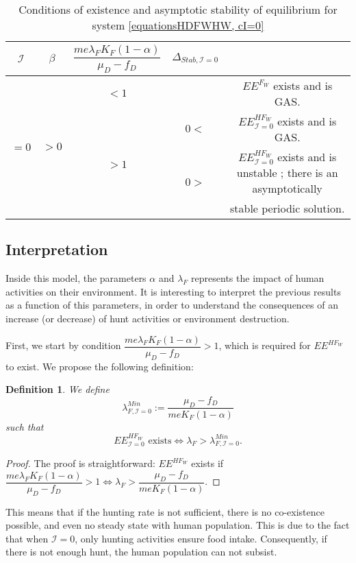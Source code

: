 \documentclass{article}
\newcommand{\lfw}{\lambda_{F}}
\newcommand{\lfw}{\lambda_{F}}
\newcommand{\cI}{\mathcal{I}}
\newtheorem{definition}{Definition}
\begin{document}
\begin{table}[!ht]
\centering
\def\arraystretch{2}
\begin{tabular}{c|c|c|c|c}
$\cI$ &$\beta$ & $\dfrac{m e\lfw K_F(1-\alpha)}{\mu_D - f_D}$ &  $\Delta_{Stab, \cI =0}$ & \\
\hline
\multirow{4}{*}{$=0$}&\multirow{4}{*}{$>0$} & $ < 1$ & &$EE^{F_W}$ exists and is GAS.  \\
\cline{3-5}
 & & \multirow{3}{*}{$> 1$} & $ 0<$ &$EE^{HF_W}_{\cI=0}$ exists and is GAS.\\
 \cline{4-5}
 & & &\multirow{2}{*}{$ 0> $} & $EE^{HF_W}_{\cI=0}$ exists and is unstable ; there is an asymptotically \\
& & & &  stable periodic solution.
\end{tabular}
\caption{\centering Conditions of existence and asymptotic stability of equilibrium for system \eqref{equationsHDFWHW, cI=0}}
\end{table}

\subsection{Interpretation}
Inside this model, the parameters $\alpha$ and $\lfw$ represents the impact of human activities on their environment. It is interesting to interpret the previous results as a function of this parameters, in order to understand the consequences of an increase (or decrease) of hunt activities or environment destruction.

First, we start by condition $\dfrac{m e \lfw  K_F(1-\alpha)}{\mu_D - f_D} > 1$, which is required for $EE^{HF_W}$ to exist. We propose the following definition:

\begin{definition}\label{defLambdaMin, cI=0} We define 
$$\lambda_{F, \cI=0}^{Min} := \dfrac{\mu_D - f_D}{m e K_F(1-\alpha)}$$
such that 
$$
\text{$EE^{HF_W}_{\cI = 0}$ exists} \Leftrightarrow  \lfw > \lambda_{F, \cI=0}^{Min}.
$$
\end{definition}
\begin{proof}
The proof is straightforward: $EE^{HF_W}$ exists if $\dfrac{m e \lfw K_F(1-\alpha)}{\mu_D - f_D} > 1 \Leftrightarrow  \lfw> \dfrac{\mu_D - f_D}{ m e K_F(1-\alpha)} $.
\end{proof}

This means that if the hunting rate is not sufficient, there is no co-existence possible, and even no steady state with human population. This is due to the fact that when $\cI = 0$, only hunting activities ensure food intake. Consequently, if there is not enough hunt, the human population can not subsist.
\end{document}
